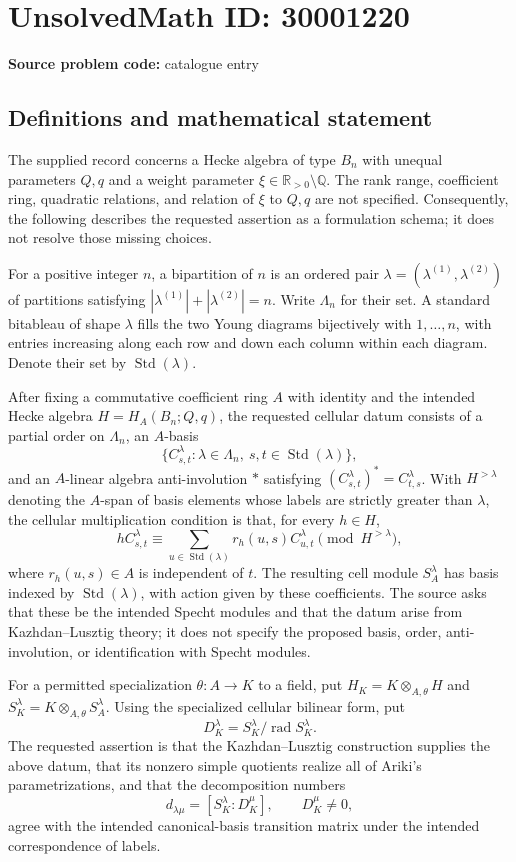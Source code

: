 \documentclass[11pt]{article}
\newcommand{\Q}{\mathbb{Q}}
\newcommand{\R}{\mathbb{R}}
\begin{document}
\section*{UnsolvedMath ID: 30001220}
\textbf{Source problem code:} catalogue entry
\subsection{Definitions and mathematical statement}
The supplied record concerns a Hecke algebra of type \(B_n\) with unequal parameters \(Q,q\) and a weight parameter \(\xi\in\R_{>0}\setminus\Q\). The rank range, coefficient ring, quadratic relations, and relation of \(\xi\) to \(Q,q\) are not specified. Consequently, the following describes the requested assertion as a formulation schema; it does not resolve those missing choices.

For a positive integer \(n\), a bipartition of \(n\) is an ordered pair \(\lambda=(\lambda^{(1)},\lambda^{(2)})\) of partitions satisfying \(|\lambda^{(1)}|+|\lambda^{(2)}|=n\). Write \(\Lambda_n\) for their set. A standard bitableau of shape \(\lambda\) fills the two Young diagrams bijectively with \(1,\ldots,n\), with entries increasing along each row and down each column within each diagram. Denote their set by \(\operatorname{Std}(\lambda)\).

After fixing a commutative coefficient ring \(A\) with identity and the intended Hecke algebra \(H=H_A(B_n;Q,q)\), the requested cellular datum consists of a partial order on \(\Lambda_n\), an \(A\)-basis
\[
\{C^\lambda_{s,t}:\lambda\in\Lambda_n,\ s,t\in\operatorname{Std}(\lambda)\},
\]
and an \(A\)-linear algebra anti-involution \(*\) satisfying \((C^\lambda_{s,t})^*=C^\lambda_{t,s}\). With \(H^{>\lambda}\) denoting the \(A\)-span of basis elements whose labels are strictly greater than \(\lambda\), the cellular multiplication condition is that, for every \(h\in H\),
\[
hC^\lambda_{s,t}\equiv
\sum_{u\in\operatorname{Std}(\lambda)}r_h(u,s)C^\lambda_{u,t}
\pmod{H^{>\lambda}},
\]
where \(r_h(u,s)\in A\) is independent of \(t\). The resulting cell module \(S_A^\lambda\) has basis indexed by \(\operatorname{Std}(\lambda)\), with action given by these coefficients. The source asks that these be the intended Specht modules and that the datum arise from Kazhdan--Lusztig theory; it does not specify the proposed basis, order, anti-involution, or identification with Specht modules.

For a permitted specialization \(\theta:A\to K\) to a field, put \(H_K=K\otimes_{A,\theta}H\) and \(S_K^\lambda=K\otimes_{A,\theta}S_A^\lambda\). Using the specialized cellular bilinear form, put
\[
D_K^\lambda=S_K^\lambda/\operatorname{rad}S_K^\lambda.
\]
The requested assertion is that the Kazhdan--Lusztig construction supplies the above datum, that its nonzero simple quotients realize all of Ariki's parametrizations, and that the decomposition numbers
\[
d_{\lambda\mu}=[S_K^\lambda:D_K^\mu],\qquad D_K^\mu\ne0,
\]
agree with the intended canonical-basis transition matrix under the intended correspondence of labels.
\end{document}
